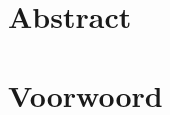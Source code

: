 %
%

\maketitle
{}


%
%

\chapter*{Abstract}
\label{chap:abstract}

%
%

\chapter*{Voorwoord}
\label{chap:voorwoord}


%
%

\setlength\cftpartnumwidth{2em}

\newpage

\label{chap:inhoudstafel}
\tableofcontents

\newpage


